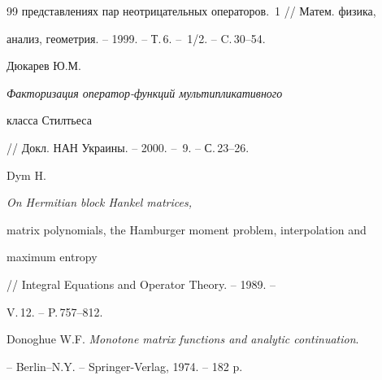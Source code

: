 \begin{thebibliography}{99}
{представлениях пар неотрицательных операторов}.~1 // Матем. физика,


анализ, геометрия. -- 1999. -- Т.\,6. -- \No\,1/2. -- C.\,30--54.




Дюкарев Ю.М. {\em Факторизация оператор-функций мультипликативного


класса Стилтьеса} // Докл. НАН Украины. -- 2000. -- \No\,9. -- С.\,23--26.




Dym H. {\em On Hermitian block Hankel matrices,


matrix polynomials, the Hamburger moment problem, interpolation and


maximum entropy} // Integral Equations and Operator Theory. -- 1989. --


V.\,12. -- P.\,757--812.




Donoghue W.F. {\em Monotone matrix functions and analytic continuation}.


-- Berlin--N.\;Y. -- Springer-Verlag, 1974. -- 182 p.





\end{thebibliography}





\vskip 2cm












\label{end}






